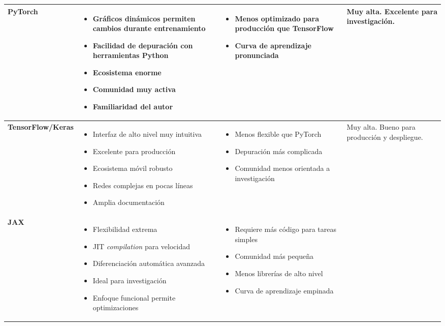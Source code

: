 \begin{xltabular}{\textwidth}{@{} >{\centering\arraybackslash}p{0.15\textwidth} >{\raggedright\arraybackslash}X >{\raggedright\arraybackslash}X >{\raggedright\arraybackslash}X @{}}
\bottomrule
\endlastfoot%
	\textbf{PyTorch} &
	\begin{itemize}[nosep] \item Gráficos dinámicos permiten cambios durante entrenamiento \item Facilidad de depuración con herramientas Python \item Ecosistema enorme \item Comunidad muy activa \item Familiaridad del autor \end{itemize} &
	\begin{itemize}[nosep] \item Menos optimizado para producción que TensorFlow \item Curva de aprendizaje pronunciada \end{itemize} &
	 Muy alta. Excelente para investigación. \\
	\midrule
	\textbf{TensorFlow/Keras} &
	\begin{itemize}[nosep] \item Interfaz de alto nivel muy intuitiva \item Excelente para producción \item Ecosistema móvil robusto \item Redes complejas en pocas líneas \item Amplia documentación \end{itemize} &
	\begin{itemize}[nosep] \item Menos flexible que PyTorch \item Depuración más complicada \item Comunidad menos orientada a investigación \end{itemize} &
	 Muy alta. Bueno para producción y despliegue. \\
	\midrule
	\textbf{JAX} &
	\begin{itemize}[nosep] \item Flexibilidad extrema \item JIT \textit{compilation} para velocidad \item Diferenciación automática avanzada \item Ideal para investigación \item Enfoque funcional permite optimizaciones \end{itemize} &
	\begin{itemize}[nosep] \item Requiere más código para tareas simples \item Comunidad más pequeña \item Menos librerías de alto nivel \item Curva de aprendizaje empinada \end{itemize} &

\end{xltabular}
